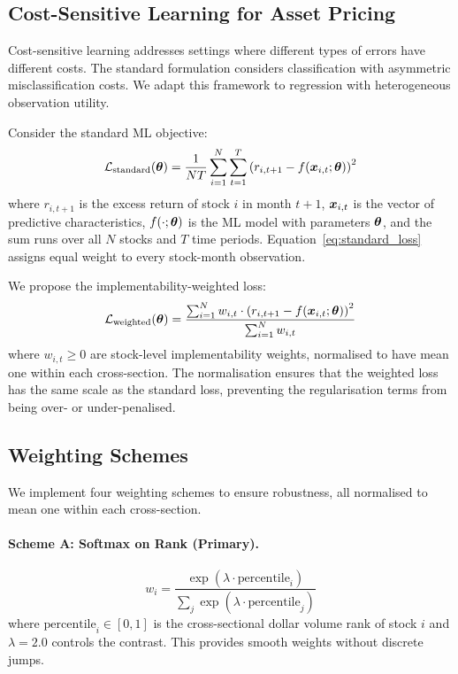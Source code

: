 \documentclass[a4paper,12pt,final]{article}
\begin{document}
\subsection{Cost-Sensitive Learning for Asset Pricing}
\label{subsec:cost_sensitive}

Cost-sensitive learning \citep{elkan2001foundations} addresses settings where different types of errors have different costs. The standard formulation considers classification with asymmetric misclassification costs. We adapt this framework to regression with heterogeneous observation utility.

Consider the standard ML objective:
\begin{equation}
\mathcal{L}_{\text{standard}}(\bm{\theta}) = \frac{1}{NT}\sum_{i=1}^{N}\sum_{t=1}^{T} \left(r_{i,t+1} - f(\bm{x}_{i,t}; \bm{\theta})\right)^2
\label{eq:standard_loss}
\end{equation}
where $r_{i,t+1}$ is the excess return of stock $i$ in month $t+1$, $\bm{x}_{i,t}$ is the vector of predictive characteristics, $f(\cdot;\bm{\theta})$ is the ML model with parameters $\bm{\theta}$, and the sum runs over all $N$ stocks and $T$ time periods. Equation~\eqref{eq:standard_loss} assigns equal weight to every stock-month observation.

We propose the implementability-weighted loss:
\begin{equation}
\mathcal{L}_{\text{weighted}}(\bm{\theta}) = \frac{\sum_{i=1}^{N} w_{i,t} \cdot \left(r_{i,t+1} - f(\bm{x}_{i,t}; \bm{\theta})\right)^2}{\sum_{i=1}^{N} w_{i,t}}
\label{eq:weighted_loss}
\end{equation}
where $w_{i,t} \geq 0$ are stock-level implementability weights, normalised to have mean one within each cross-section. The normalisation ensures that the weighted loss has the same scale as the standard loss, preventing the regularisation terms from being over- or under-penalised.

\subsection{Weighting Schemes}
\label{subsec:weighting_schemes}

We implement four weighting schemes to ensure robustness, all normalised to mean one within each cross-section.

\paragraph{Scheme A: Softmax on Rank (Primary).}
\begin{equation}
w_i = \frac{\exp(\lambda \cdot \text{percentile}_i)}{\sum_{j} \exp(\lambda \cdot \text{percentile}_j)}
\label{eq:softmax_rank}
\end{equation}
where $\text{percentile}_i \in [0,1]$ is the cross-sectional dollar volume rank of stock $i$ and $\lambda = 2.0$ controls the contrast. This provides smooth weights without discrete jumps.
\end{document}
